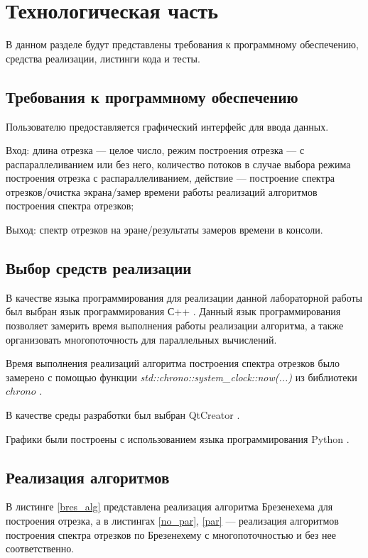 \chapter{Технологическая часть}

В данном разделе будут представлены требования к программному обеспечению, средства реализации, листинги кода и тесты.

\section{Требования к программному обеспечению}
Пользователю предоставляется графический интерфейс для ввода данных.

Вход: длина отрезка --- целое число, режим построения отрезка --- с распараллеливанием или без него, количество потоков в случае выбора режима построения отрезка с распараллеливанием, действие --- построение спектра отрезков/очистка экрана/замер времени работы реализаций алгоритмов построения спектра отрезков;

Выход: спектр отрезков на эране/результаты замеров времени в консоли.

\section{Выбор средств реализации}

В качестве языка программирования для реализации данной лабораторной работы был выбран язык программирования С++ \cite{cpp}. Данный язык программирования позволяет замерить время выполнения работы реализации алгоритма, а также организовать многопоточность для параллельных вычислений.

Время выполнения реализаций алгоритма построения спектра отрезков было замерено с помощью функции \textit{std::chrono::system\_clock::now(...)} из библиотеки $chrono$ \cite{chrono}.

В качестве среды разработки был выбран QtCreator \cite{qt}. 

Графики были построены с использованием языка программирования Python \cite{PythonBook}.

\section{Реализация алгоритмов}

В листинге \ref{bres_alg} представлена реализация алгоритма Брезенехема для построения отрезка, а в листингах \ref{no_par}, \ref{par} --- реализация алгоритмов построения спектра отрезков по Брезенехему с многопоточностью и без нее соответственно.

